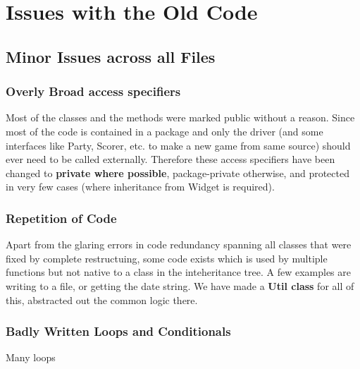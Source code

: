 \section{Issues with the Old Code}

\subsection{Minor Issues across all Files}

\subsubsection{Overly Broad access specifiers}

Most of the classes and the methods were marked public without a reason. Since most of the code is contained in a package and only the driver (and some interfaces like Party, Scorer, etc. to make a new game from same source) should ever need to be called externally. Therefore these access specifiers have been changed to \textbf{private where possible}, package-private otherwise, and protected in very few cases (where inheritance from Widget is required).

\subsubsection{Repetition of Code}

Apart from the glaring errors in code redundancy spanning all classes that were fixed by complete restructuing, some code exists which is used by multiple functions but not native to a class in the inteheritance tree. A few examples are writing to a file, or getting the date string. We have made a \textbf{Util class} for all of this, abstracted out the common logic there.

\subsubsection{Badly Written Loops and Conditionals}

Many loops